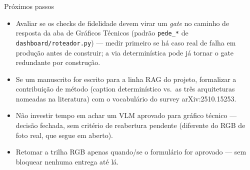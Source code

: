 \documentclass{beamer}
\begin{document}
\begin{frame}{Próximos passos}
  \begin{itemize}
    \item Avaliar se os checks de fidelidade devem virar um \emph{gate} no caminho de
      resposta da aba de Gráficos Técnicos (padrão \texttt{pede\_*} de
      \texttt{dashboard/roteador.py}) — medir primeiro se há caso real de falha em produção
      antes de construir; a via determinística pode já tornar o gate redundante por
      construção.
    \item Se um manuscrito for escrito para a linha RAG do projeto, formalizar a
      contribuição de método (caption determinístico vs.\ as três arquiteturas nomeadas na
      literatura) com o vocabulário do survey arXiv:2510.15253.
    \item Não investir tempo em achar um VLM aprovado para gráfico técnico — decisão
      fechada, sem critério de reabertura pendente (diferente do RGB de foto real, que
      segue em aberto).
    \item Retomar a trilha RGB apenas quando/se o formulário for aprovado — sem bloquear
      nenhuma entrega até lá.
  \end{itemize}
\end{frame}
\end{document}

